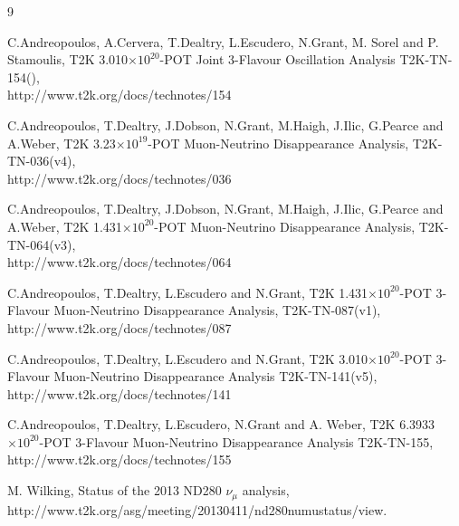 %
%

\clearpage

\begin{thebibliography}{9}

%
%


   C.Andreopoulos, A.Cervera, T.Dealtry, L.Escudero, N.Grant, M. Sorel and P. Stamoulis,
   T2K 3.010$\times10^{20}$-POT Joint 3-Flavour Oscillation Analysis
   T2K-TN-154({\color{red}{v4}}),\\
   http://www.t2k.org/docs/technotes/154

   C.Andreopoulos, T.Dealtry, J.Dobson, N.Grant, M.Haigh, J.Ilic, G.Pearce and A.Weber,
   T2K 3.23$\times10^{19}$-POT Muon-Neutrino Disappearance Analysis,
   T2K-TN-036(v4),\\
   http://www.t2k.org/docs/technotes/036

  C.Andreopoulos, T.Dealtry, J.Dobson, N.Grant, M.Haigh, J.Ilic, G.Pearce and A.Weber,
  T2K 1.431$\times10^{20}$-POT Muon-Neutrino Disappearance Analysis,
  T2K-TN-064(v3),\\
  http://www.t2k.org/docs/technotes/064

   C.Andreopoulos, T.Dealtry, L.Escudero and N.Grant,
   T2K 1.431$\times10^{20}$-POT 3-Flavour Muon-Neutrino Disappearance Analysis,
   T2K-TN-087(v1),\\
   http://www.t2k.org/docs/technotes/087

   C.Andreopoulos, T.Dealtry, L.Escudero and N.Grant,
   T2K 3.010$\times10^{20}$-POT 3-Flavour Muon-Neutrino Disappearance Analysis
   T2K-TN-141(v5),\\
   http://www.t2k.org/docs/technotes/141

   C.Andreopoulos, T.Dealtry, L.Escudero, N.Grant and A. Weber,
   T2K 6.3933$\times10^{20}$-POT 3-Flavour Muon-Neutrino Disappearance Analysis
   T2K-TN-155,\\
   http://www.t2k.org/docs/technotes/155

%
%

  M. Wilking,
  Status of the 2013 ND280 $\nu_{\mu}$ analysis,
  http://www.t2k.org/asg/meeting/20130411/nd280numustatus/view.


\end{thebibliography}

